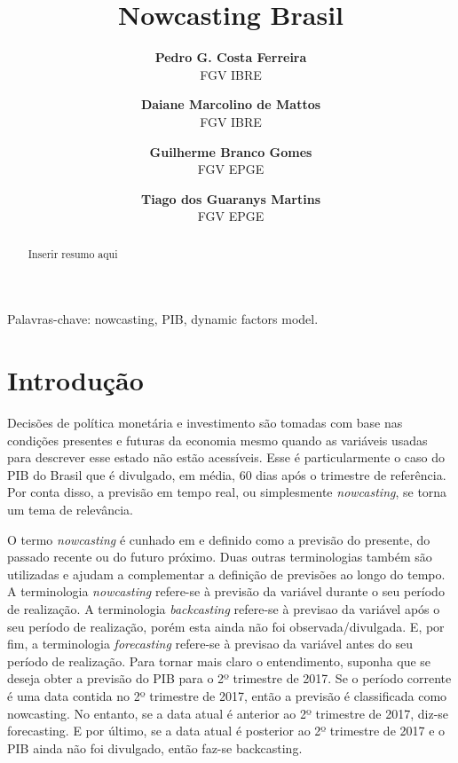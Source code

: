 \documentclass{article}
\title{\textbf{Nowcasting Brasil}}
\author{
\textbf{Pedro G. Costa Ferreira} \\
\small{FGV IBRE}
\and
\textbf{Daiane Marcolino de Mattos}\\
\small{FGV IBRE}
\and
\textbf{Guilherme Branco Gomes}\\
\small{FGV EPGE}
\and
\textbf{Tiago dos Guaranys Martins}\\
\small{FGV EPGE}
}
\date{}
\begin{document}


\maketitle %

\begin{abstract}
Inserir resumo aqui
\end{abstract}

Palavras-chave: nowcasting, PIB, dynamic factors model.

{\let\thefootnote\relax{}}


\section{Introdução}\label{intro}

Decisões de política monetária e investimento são tomadas com base nas condições presentes e futuras da economia mesmo quando as variáveis usadas para descrever esse estado não estão acessíveis. Esse é particularmente o caso do PIB do Brasil que é divulgado, em média, 60 dias após o trimestre de referência. Por conta disso, a previsão em tempo real, ou simplesmente \textit{nowcasting}, se torna um tema de relevância.




O termo \textit{nowcasting} é cunhado em \cite{giannoneetal2008} e definido como a previsão do
presente, do passado recente ou do futuro próximo. Duas outras terminologias também são utilizadas e ajudam a complementar a definição de previsões ao longo do tempo. A terminologia \textit{nowcasting} refere-se à previsão da variável durante o seu período de realização. A terminologia \textit{backcasting} refere-se à previsao da variável após o seu período de realização, porém esta ainda não foi observada/divulgada. E, por fim, a terminologia \textit{forecasting} refere-se à previsao da variável antes do seu período de realização. Para tornar mais claro o entendimento, suponha que se deseja obter a previsão do PIB para o 2º trimestre de 2017. Se o período corrente é uma data contida no 2º trimestre de 2017, então a previsão é classificada como nowcasting. No entanto, se a data atual é anterior ao 2º trimestre de 2017, diz-se forecasting. E por último, se a data atual é posterior ao 2º trimestre de 2017 e o PIB ainda não foi divulgado, então faz-se backcasting.
\end{document}
